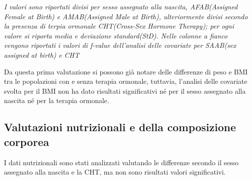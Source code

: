 \documentclass[12pt]{article}
\begin{document}
\begin{table}[H]
\centering
    \caption{Valutazioni sociodemografiche e valori di peso e BMI}
    \vspace*{0.2em}
{\renewcommand{\arraystretch}{2}%
}
    \label{tab:my_label}
    \footnotesize \textit{I valori sono riportati divisi per sesso assegnato alla nascita, AFAB(Assigned Female at Birth) e AMAB(Assigned Male at Birth), ulteriormente divisi secondo la presenza di terpia ormonale CHT(Cross-Sex Hormone Therapy); per ogni valore si riporta media e deviazione standard(StD). Nelle colonne a fianco vengono riportati i valori di f-value dell'analisi delle covariate per SAAB(sex assigned at birth) e CHT}
\end{table}

Da questa prima valutazione si possono già notare delle differenze di peso e BMI tra le popolazioni con e senza terapia ormonale, tuttavia, l'analisi delle covariate svolta per il BMI non ha dato risultati significativi né per il sesso assegnato alla nascita né per la terapia ormonale.
\subsection{Valutazioni nutrizionali e della composizione corporea}
\label{sec:orgb85ade1}
I dati nutrizionali sono stati analizzati valutando le differenze secondo il sesso assegnato alla nascita e la CHT, ma non sono risultati valori significativi.
\end{document}
